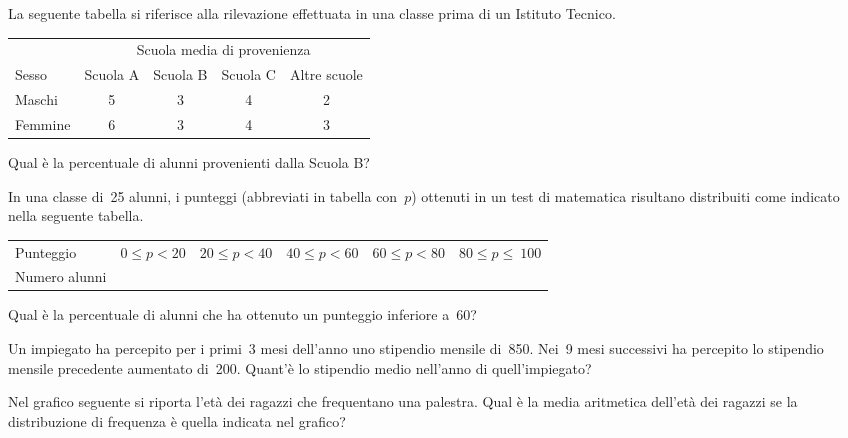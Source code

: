 \begin{esercizio}
\label{ese:A.52}
La seguente tabella si riferisce alla rilevazione effettuata in una classe 
prima di un Istituto Tecnico.
\begin{center}
 \begin{tabular}{l*{4}{c}}
\toprule
 & \multicolumn{4}{c}{Scuola media di provenienza}\\
Sesso & Scuola A & Scuola B & Scuola C & Altre scuole\\
\midrule
Maschi & 5 & 3 & 4 & 2 \\
Femmine & 6 & 3 & 4 & 3 \\
\bottomrule
\end{tabular}
\end{center}
Qual è la percentuale di alunni provenienti dalla Scuola B?
\end{esercizio}

\begin{esercizio}
\label{ese:A.53}
In una classe di~25 alunni, i punteggi (abbreviati in tabella con~$p$) 
ottenuti in un test di matematica risultano distribuiti come indicato nella 
seguente tabella.
\begin{center}
 \begin{tabular}{l*{5}{c}}
\toprule
Punteggio & $0 \leq p < 20$ & $20 \leq p < 40$ & $40 \leq p < 60$ & $60 
\leq p < 80$ & $80 \leq p \leq~100$ \\
Numero alunni & & & & & \\
\bottomrule
\end{tabular}
\end{center}
Qual è la percentuale di alunni che ha ottenuto un punteggio inferiore a~60?
\end{esercizio}

\begin{esercizio}
\label{ese:A.54}
Un impiegato ha percepito per i primi~3 mesi dell'anno uno stipendio 
mensile di~850\officialeuro . Nei~9 mesi successivi ha percepito
lo stipendio mensile precedente aumentato di~200\officialeuro . Quant'è lo 
stipendio medio nell'anno di quell'impiegato?
\end{esercizio}

\begin{multicols}{2}
\begin{esercizio}
\label{ese:A.55}
Nel grafico seguente si riporta l'età dei ragazzi che frequentano una 
palestra. Qual è la media aritmetica dell'età dei ragazzi
se la distribuzione di frequenza è quella indicata nel grafico?
\begin{center}
 
\end{center}
\end{esercizio}
\end{multicols}

